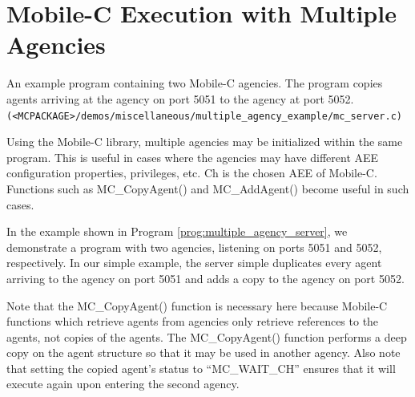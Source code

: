\documentclass[11pt]{report}
\begin{document}
\section{Mobile-C Execution with Multiple Agencies}
\begin{Program}[!t]
\begin{center}
   {\footnotesize \linespread{1.0} }
\end{center}
\caption{An example program containing two Mobile-C agencies. The program
copies agents arriving at the agency on port 5051 to the agency at port
5052.\texttt{(<MCPACKAGE>/demos/miscellaneous/multiple\_agency\_example/mc\_server.c)}}
\label{prog:multiple_agency_server}
\end{Program}

Using the Mobile-C library, multiple agencies may be initialized 
within the same program. This is useful in cases where the agencies
may have different AEE configuration properties, privileges, etc. 
Ch is the chosen AEE of Mobile-C. 
Functions such as MC\_CopyAgent() and MC\_AddAgent() become useful
in such cases. 

In the example shown in Program \vref{prog:multiple_agency_server},
we demonstrate a program with two agencies, listening on ports
5051 and 5052, respectively. In our simple example, the server
simple duplicates every agent arriving to the agency on port 5051
and adds a copy to the agency on port 5052. 

Note that the 
MC\_CopyAgent() function is necessary here because Mobile-C
functions which retrieve agents from agencies only retrieve references
to the agents, not copies of the agents. The MC\_CopyAgent() function performs
a deep copy on the agent structure so that it may be used in another
agency. Also note that setting the copied agent's status to 
``MC\_WAIT\_CH'' ensures that it will execute again upon entering the 
second agency. 

\end{document}
